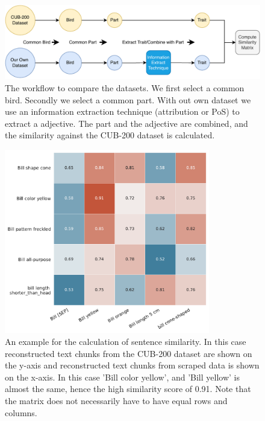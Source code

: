 \documentclass[a4paper, 12pt, oneside]{book} %
\begin{document}
\begin{figure} [htbp]
    \centering
    \includegraphics[width=1\textwidth]{figures/Similarity_workflow.pdf}
    \caption[Similarity Workflow]{The workflow to compare the datasets. We first select a common bird. Secondly we select a common part. With out own dataset we use an information extraction technique (attribution or PoS) to extract a adjective. The part and the adjective are combined, and the similarity against the CUB-200 dataset is calculated.}
    \label{fig:similarity_workflow}
\end{figure}

\begin{figure} [htbp]
    \centering
    \includegraphics[width=0.8\textwidth]{similarity_matrix.pdf}
    \caption[Example of sentence similarity]{An example for the calculation of sentence similarity. 
    In this case reconstructed text chunks from the CUB-200 dataset are shown on the y-axis and reconstructed text chunks from scraped data is shown on the x-axis. In this case 'Bill color yellow', and 'Bill yellow' is almost the same, hence the high similarity score of 0.91. Note that the matrix does not necessarily have to have equal rows and columns.}
    \label{fig:similarity_matrix}
\end{figure}
\end{document}

